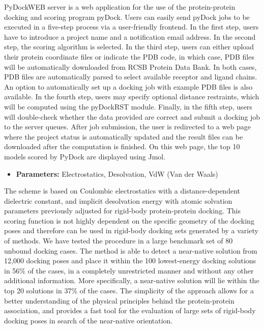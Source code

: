 \documentclass[11pt, letterpaper, english]{article}
\begin{document}
    \par{PyDockWEB server is a web application for the use of the protein-protein docking and scoring program pyDock. Users can easily send pyDock jobs to be executed in a five-step process via a user-friendly frontend. In the first step, users have to introduce a project name and a notification email address. In the second step, the scoring algorithm is selected. In the third step, users can either upload their protein coordinate files or indicate the PDB code, in which case, PDB files will be automatically downloaded from RCSB Protein Data Bank. In both cases, PDB files are automatically parsed to select available receptor and ligand chains. An option to automatically set up a docking job with example PDB files is also available. In the fourth step, users may specify optional distance restraints, which will be computed using the pyDockRST module. Finally, in the fifth step, users will double-check whether the data provided are correct and submit a docking job to the server queues. After job submission, the user is redirected to a web page where the project status is automatically updated and the result files can be downloaded after the computation is finished. On this web page, the top 10 models scored by PyDock are displayed using Jmol.}

\begin{itemize}
    \item  \textbf{Parameters:} Electrostatics, Desolvation, VdW (Van der Waals)
\end{itemize}
   
    \par{The scheme is based on Coulombic electrostatics with a distance-dependent dielectric constant, and implicit desolvation energy with atomic solvation parameters previously adjusted for rigid-body protein-protein docking. This scoring function is not highly dependent on the specific geometry of the docking poses and therefore can be used in rigid-body docking sets generated by a variety of methods. We have tested the procedure in a large benchmark set of 80 unbound docking cases. The method is able to detect a near-native solution from 12,000 docking poses and place it within the 100 lowest-energy docking solutions in 56\% of the cases, in a completely unrestricted manner and without any other additional information. More specifically, a near-native solution will lie within the top 20 solutions in 37\% of the cases. The simplicity of the approach allows for a better understanding of the physical principles behind the protein-protein association, and provides a fast tool for the evaluation of large sets of rigid-body docking poses in search of the near-native orientation.}
    
\end{document}
